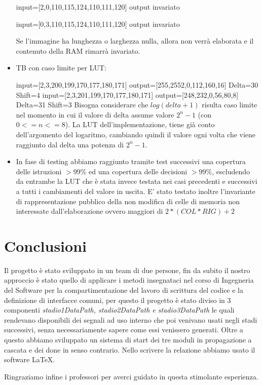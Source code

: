 \documentclass{article}
\begin{document}
\begin{itemize}
 input=[2,0,110,115,124,110,111,120] 
 output invariato
 
  input=[0,3,110,115,124,110,111,120]  
 output invariato
 
 Se l'immagine ha lunghezza o larghezza nulla, allora non verrà elaborata e il contenuto della RAM rimarrà invariato. 
\newpage
 \item TB con caso limite per LUT: 
 
  input=[2,3,200,199,170,177,180,171] 
 output=[255,2552,0,112,160,16]
 \newline
 Delta=30 Shift=4
  \newline
 input=[2,3,201,199,170,177,180,171] 
 output=[248,232,0,56,80,8]
  \newline
 Delta=31 Shift=3
  \newline
  Bisogna considerare che \(log (delta +1)\) risulta caso limite nel momento in cui il valore di delta assume valore \(2^{n}-1\) (con \(0<=n<=8\)). La LUT dell'implementazione, tiene già conto dell'argomento del logaritmo, cambiando quindi il valore ogni volta che viene raggiunto dal delta una potenza di \(2^{n}-1\).  
	\item In fase di testing abbiamo raggiunto tramite test successivi una copertura delle istruzioni \(>99\%\) ed una copertura delle decisioni \(>99\%\), escludendo da entrambe la LUT che è stata invece testata nei casi precedenti e successivi a tutti i cambiamenti del valore in uscita. E' stato testato inoltre l'invariante di rappresentazione pubblico della non modifica di celle di memoria non interessate dall'elaborazione ovvero maggiori di \(2*(COL * RIG) + 2 \)
\end{itemize}
\section{Conclusioni}
Il progetto è stato sviluppato in un team di due persone, fin da subito il nostro approccio è stato quello di applicare i metodi insegnataci nel corso di Ingegneria del Software per la compartimentazione del lavoro di scrittura del codice e la definizione di interfacce comuni, per questo il progetto è stato diviso in 3 componenti \emph{stadio1DataPath, stadio2DataPath \emph{e} stadio3DataPath} le quali rendevano disponibili dei segnali ad uso interno che poi venivano usati negli stadi successivi, senza necessariamente sapere come essi venissero generati. Oltre a questo abbiamo sviluppato un sistema di start dei tre moduli in propagazione a cascata e dei done in senso contrario. Nello scrivere la relazione abbiamo usato il software LaTeX.

Ringraziamo infine i professori per averci guidato in questa stimolante esperienza.
\end{document}
